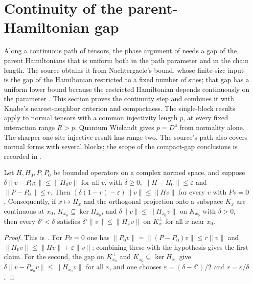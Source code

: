 \section{Continuity of the parent-Hamiltonian gap}
\label{sec:parent_hamiltonian_gap_continuity}

Along a continuous path of tensors, the phase argument of
\cite[Appendix~A, lines~2475--2580]{Schuch2011Phases} needs a gap of the
parent Hamiltonians that is uniform both in the path parameter and in the
chain length. The source obtains it from Nachtergaele's bound, whose
finite-size input is the gap of the Hamiltonian restricted to a fixed number
of sites; that gap has a uniform lower bound because the restricted
Hamiltonian depends continuously on the parameter
\cite[lines~2575--2578]{Schuch2011Phases}. This section proves the
continuity step and combines it with Knabe's nearest-neighbor criterion and
compactness. The single-block results apply to normal tensors with a common
injectivity length $p$, at every fixed interaction range $R>p$.
Quantum Wielandt gives $p=D^4$ from normality alone. The sharper
one-site injective result has range two. The source's path also covers
normal forms with several blocks; the scope of the compact-gap conclusions
is recorded in
\cite{gap:spc11_uniform_gap_injective_scope}.

\begin{lemma}
    \label{thm:kernel_gap_perturbation}
    \leanok
    Let $H,H_0,P,P_0$ be bounded operators on a complex normed space, and
    suppose $\delta\lVert v-P_0v\rVert\leq\lVert H_0v\rVert$ for all $v$, with
    $\delta\geq0$, $\lVert H-H_0\rVert\leq\varepsilon$ and
    $\lVert P-P_0\rVert\leq r$. Then
    $(\delta(1-r)-\varepsilon)\lVert v\rVert\leq\lVert Hv\rVert$ for every $v$
    with $Pv=0$. Consequently, if $x\mapsto H_x$ and the orthogonal projection
    onto a subspace $K_x$ are continuous at $x_0$, $K_{x_0}\subseteq\ker H_{x_0}$,
    and $\delta\lVert v\rVert\leq\lVert H_{x_0}v\rVert$ on $K_{x_0}^\perp$ with
    $\delta>0$, then every $\delta'<\delta$ satisfies
    $\delta'\lVert v\rVert\leq\lVert H_xv\rVert$ on $K_x^\perp$ for all $x$
    near $x_0$.
\end{lemma}

\begin{proof}
    \leanok
    This is~\cite[``Gap stability under perturbation of operator and kernel
        projection'']{QICLean2026Blueprint}.
    For $Pv=0$ one has $\lVert P_0v\rVert=\lVert(P-P_0)v\rVert\leq r\lVert v\rVert$
    and $\lVert H_0v\rVert\leq\lVert Hv\rVert+\varepsilon\lVert v\rVert$;
    combining these with the hypothesis gives the first claim. For the second,
    the gap on $K_{x_0}^\perp$ and $K_{x_0}\subseteq\ker H_{x_0}$ give
    $\delta\lVert v-P_{x_0}v\rVert\leq\lVert H_{x_0}v\rVert$ for all $v$, and
    one chooses $\varepsilon=(\delta-\delta')/2$ and $r=\varepsilon/\delta$.
\end{proof}

